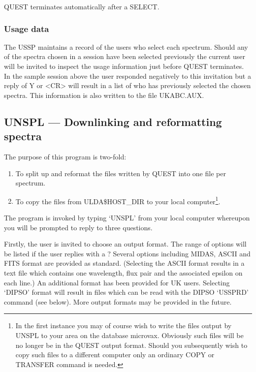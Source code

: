 QUEST terminates automatically after a SELECT.

\subsubsection {Usage data}

The USSP maintains a record of the users who select each spectrum.
Should any of the spectra chosen in a session have been selected previously 
the current user will be invited to inspect the usage information just before 
QUEST terminates.
In the sample session above the user responded negatively to this 
invitation but a reply of Y or <CR> will result
in a list of who has previously selected the chosen spectra.
This information is also written to the file UKABC.AUX.


\subsection{UNSPL --- Downlinking and reformatting spectra}

The purpose of this program is two-fold:
\begin{enumerate}
\item To split up and reformat the  files written by QUEST into 
one file per spectrum.

\item To copy the files from ULDA\$HOST\_DIR to your local 
computer\footnote{In the first instance you may of course wish to write the files output by UNSPL
to your area on the database microvax.
Obviously such files will be no longer be in the QUEST output format.
Should you subsequently wish to copy such files to a different computer only
an ordinary COPY or TRANSFER command is needed.}.
\end{enumerate}

The program is invoked by typing `UNSPL' from your local computer whereupon
you will be prompted to reply to three questions.

Firstly, the user is invited to choose an output format.
The range of options will be listed if the user replies with a ? 
Several options including MIDAS, ASCII and FITS format are provided as standard.
(Selecting the ASCII format results in a text file which contains one  
wavelength, 
flux pair and the associated epsilon on each line.)
An additional format has been provided for UK users.
Selecting `DIPSO' format will result in files which can be read with the DIPSO 
`USSPRD' command (see below).
More output formats may be provided in the future.

